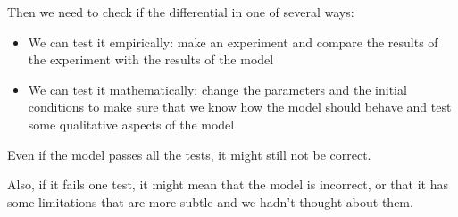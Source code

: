 Then we need to check if the differential in one of several ways:
\begin{itemize}
	\item We can test it empirically: make an experiment and compare the results of the experiment with the results of the model
	\item We can test it mathematically: change the parameters and the initial conditions to make sure that we know how the model should behave and test some qualitative aspects of the model
\end{itemize}

\begin{important}
Even if the model passes all the tests, it might still not be correct.

Also, if it fails one test, it might mean that the model is incorrect, or that it has some limitations that are more subtle and we hadn't thought about them.	
\end{important}

